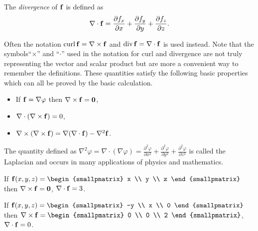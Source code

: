 \begin{definition}[divergence]%
    \label{def:div}
    The \emph{divergence} of \(\mathbf{f}\) is defined as
    \[
        \nabla \cdot \mathbf{f} = \frac{\partial f_x}{\partial x} +  \frac{\partial f_y}{\partial y} +  \frac{\partial f_z}{\partial z}.
    \]
\end{definition}

Often the notation
\(\operatorname{curl} \mathbf{f} = \nabla \times \mathbf{f}\)
and \(\operatorname{div} \mathbf{f} = \nabla \cdot \mathbf{f}\) is used instead.
Note that the symbols``\(\times\)'' and ``\(\cdot\)'' used in the notation for curl and divergence are not truly representing the vector and scalar product but are more a convenient way to remember the definitions.
These quantities satisfy the following basic properties which can all be proved by the basic calculation.
\begin{itemize}
    \item If \(\mathbf{f} = \nabla \varphi\) then \( \nabla \times \mathbf{f} = \mathbf{0} \),
    \item \(\nabla \cdot (\nabla \times \mathbf{f}) = 0\),
    \item \(\nabla \times (\nabla \times \mathbf{f}) = \nabla(\nabla\cdot \mathbf{f}) - \nabla^2 \mathbf{f}\).
\end{itemize}
The quantity defined as
\(\nabla^2 \varphi = \nabla \cdot (\nabla \varphi) =
\frac{\partial^2 \varphi}{\partial x^2} +
\frac{\partial^2 \varphi}{\partial y^2} +
\frac{\partial^2 \varphi}{\partial z^2}\)
is called the Laplacian and occurs in many applications of physics and mathematics.
\begin{example*}
    If \(\ff(x,y,z) = \begin{smallpmatrix}
        x \\ y \\ z
    \end{smallpmatrix}\)
    then
    \(\nabla \times \mathbf{f} = \mathbf{0}\),
    \(\nabla \cdot \mathbf{f} = 3\).
\end{example*}

\begin{example*}
    If \(\ff(x,y,z) = \begin{smallpmatrix}
        -y \\ x \\ 0
    \end{smallpmatrix}\)
    then
    \(\nabla \times \ff = \begin{smallpmatrix}
        0 \\ 0 \\ 2
    \end{smallpmatrix}\),
    \(\nabla \cdot \mathbf{f} = 0\).
\end{example*}

